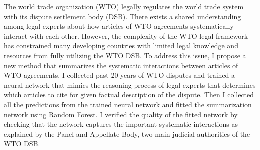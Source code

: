 The world trade organization (WTO) legally regulates the world trade system with its dispute settlement body (DSB).
There exists a shared understanding among legal experts about how articles of WTO agreements systematically interact with each other. 
However, the complexity of the WTO legal framework has constrained many developing countries with limited legal knowledge and resources from fully utilizing the WTO DSB.
To address this issue, I propose a new method that summarizes the systematic interactions between articles of WTO agreements.
I collected past 20 years of WTO disputes and trained a neural network that mimics the reasoning process of legal experts that determines which articles to cite for given factual description of the dispute.
Then I collected all the predictions from the trained neural network and fitted the summarization network using Random Forest.
I verified the quality of the fitted network by checking that the network captures the important systematic interactions as explained by the Panel and Appellate Body, two main judicial authorities of the WTO DSB.  %


